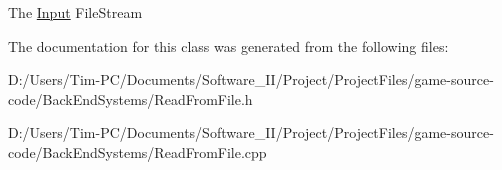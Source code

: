 The \hyperlink{class_input}{Input} File\+Stream 

The documentation for this class was generated from the following files\+:\begin{DoxyCompactItemize}
\item 
D\+:/\+Users/\+Tim-\/\+P\+C/\+Documents/\+Software\+\_\+\+I\+I/\+Project/\+Project\+Files/game-\/source-\/code/\+Back\+End\+Systems/Read\+From\+File.\+h\item 
D\+:/\+Users/\+Tim-\/\+P\+C/\+Documents/\+Software\+\_\+\+I\+I/\+Project/\+Project\+Files/game-\/source-\/code/\+Back\+End\+Systems/Read\+From\+File.\+cpp\end{DoxyCompactItemize}
